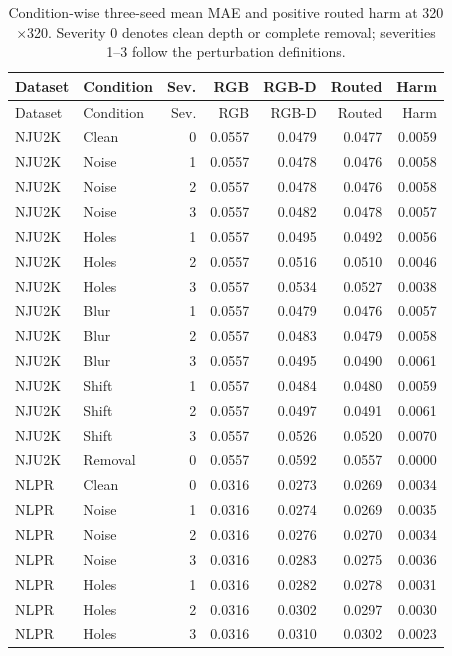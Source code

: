 \documentclass[11pt]{article}
\begin{document}
\small
\begin{longtable}{llrrrrr}
\caption{Condition-wise three-seed mean MAE and positive routed harm at 320$\times$320. Severity 0 denotes clean depth or complete removal; severities 1--3 follow the perturbation definitions.}\label{tab:conditions}\\
\toprule Dataset & Condition & Sev. & RGB & RGB-D & Routed & Harm\\\midrule
\endfirsthead
\toprule Dataset & Condition & Sev. & RGB & RGB-D & Routed & Harm\\\midrule
\endhead
\bottomrule
\endfoot
NJU2K & Clean & 0 & 0.0557 & 0.0479 & 0.0477 & 0.0059\\
NJU2K & Noise & 1 & 0.0557 & 0.0478 & 0.0476 & 0.0058\\
NJU2K & Noise & 2 & 0.0557 & 0.0478 & 0.0476 & 0.0058\\
NJU2K & Noise & 3 & 0.0557 & 0.0482 & 0.0478 & 0.0057\\
NJU2K & Holes & 1 & 0.0557 & 0.0495 & 0.0492 & 0.0056\\
NJU2K & Holes & 2 & 0.0557 & 0.0516 & 0.0510 & 0.0046\\
NJU2K & Holes & 3 & 0.0557 & 0.0534 & 0.0527 & 0.0038\\
NJU2K & Blur & 1 & 0.0557 & 0.0479 & 0.0476 & 0.0057\\
NJU2K & Blur & 2 & 0.0557 & 0.0483 & 0.0479 & 0.0058\\
NJU2K & Blur & 3 & 0.0557 & 0.0495 & 0.0490 & 0.0061\\
NJU2K & Shift & 1 & 0.0557 & 0.0484 & 0.0480 & 0.0059\\
NJU2K & Shift & 2 & 0.0557 & 0.0497 & 0.0491 & 0.0061\\
NJU2K & Shift & 3 & 0.0557 & 0.0526 & 0.0520 & 0.0070\\
NJU2K & Removal & 0 & 0.0557 & 0.0592 & 0.0557 & 0.0000\\
NLPR & Clean & 0 & 0.0316 & 0.0273 & 0.0269 & 0.0034\\
NLPR & Noise & 1 & 0.0316 & 0.0274 & 0.0269 & 0.0035\\
NLPR & Noise & 2 & 0.0316 & 0.0276 & 0.0270 & 0.0034\\
NLPR & Noise & 3 & 0.0316 & 0.0283 & 0.0275 & 0.0036\\
NLPR & Holes & 1 & 0.0316 & 0.0282 & 0.0278 & 0.0031\\
NLPR & Holes & 2 & 0.0316 & 0.0302 & 0.0297 & 0.0030\\
NLPR & Holes & 3 & 0.0316 & 0.0310 & 0.0302 & 0.0023\\

\end{longtable}
\end{document}
